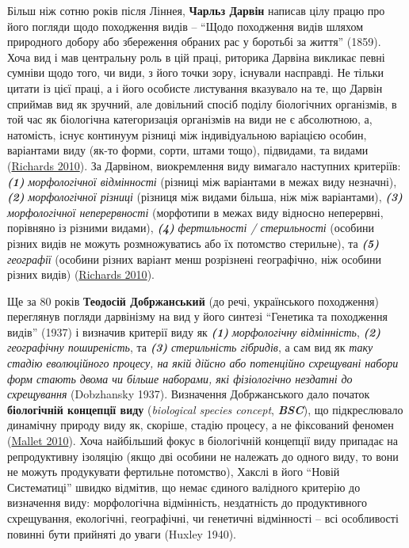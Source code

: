 \documentclass[
  11pt,
]{book}
\begin{document}
Більш ніж сотню років після Ліннея, \textbf{Чарльз Дарвін} написав цілу працю про його погляди щодо походження видів -- ``Щодо походження видів шляхом природного добору або збереження обраних рас у боротьбі за життя'' (1859). Хоча вид і мав центральну роль в цій праці, риторика Дарвіна викликає певні сумніви щодо того, чи види, з його точки зору, існували насправді. Не тільки цитати із цієї праці, а і його особисте листування вказувало на те, що Дарвін сприймав вид як зручний, але довільний спосіб поділу біологічних організмів, в той час як біологічна категоризація організмів на види не є абсолютною, а, натомість, існує континуум різниці між індивідуальною варіацією особин, варіантами виду (як-то форми, сорти, штами тощо), підвидами, та видами (\href{https://doi.org/10.1017/CBO9780511762222}{Richards 2010}). За Дарвіном, виокремлення виду вимагало наступних критеріїв: \textbf{\emph{(1)}} \emph{морфологічної відмінності} (різниці між варіантами в межах виду незначні), \textbf{\emph{(2)}} \emph{морфологічної різниці} (різниця між видами більша, ніж між варіантами), \textbf{\emph{(3)}} \emph{морфологічної неперервності} (морфотипи в межах виду відносно неперервні, порівняно із різними видами), \textbf{\emph{(4)}} \emph{фертильності / стерильності} (особини різних видів не можуть розмножуватись або їх потомство стерильне), та \textbf{\emph{(5)}} \emph{географії} (особини різних варіант менш розрізнені географічно, ніж особини різних видів) (\href{https://doi.org/10.1017/CBO9780511762222}{Richards 2010}).

Ще за 80 років \textbf{Теодосій Добржанський} (до речі, українського походження) переглянув погляди дарвінізму на вид у його синтезі ``Генетика та походження видів'' (1937) і визначив критерії виду як \textbf{\emph{(1)}} \emph{морфологічну відмінність}, \textbf{\emph{(2)}} \emph{географічну поширеність}, та \textbf{\emph{(3)}} \emph{стерильність гібридів}, а сам вид як \emph{таку стадію еволюційного процесу, на якій дійсно або потенційно схрещувані набори форм стають двома чи більше наборами, які фізіологічно нездатні до схрещування} (Dobzhansky 1937). Визначення Добржанського дало початок \textbf{біологічній концепції виду} (\emph{biological species concept}, \textbf{\emph{BSC}}), що підкреслювало динамічну природу виду як, скоріше, стадію процесу, а не фіксований феномен (\href{https://doi.org/10.1098/rstb.2010.0040}{Mallet 2010}). Хоча найбільший фокус в біологічній концепції виду припадає на репродуктивну ізоляцію (якщо дві особини не належать до одного виду, то вони не можуть продукувати фертильне потомство), Хакслі в його ``Новій Систематиці'' швидко відмітив, що немає єдиного валідного критерію до визначення виду: морфологічна відмінність, нездатність до продуктивного схрещування, екологічні, географічні, чи генетичні відмінності -- всі особливості повинні бути прийняті до уваги (Huxley 1940).
\end{document}
